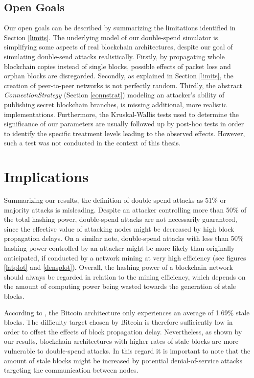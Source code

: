 \documentclass[a4paper,12pt,twoside]{report}
\begin{document}
\subsection{Open Goals}
Our open goals can be described by summarizing the limitations identified in Section \ref{limits}. The underlying model of our double-spend simulator is simplifying some aspects of real blockchain architectures, despite our goal of simulating double-send attacks realistically. Firstly, by propagating whole blockchain copies instead of single blocks, possible effects of packet loss and orphan blocks are disregarded. Secondly, as explained in Section \ref{limits}, the creation of peer-to-peer networks is not perfectly random. Thirdly, the abstract \textit{ConnectionStrategy} (Section \ref{connstrat}) modeling an attacker's ability of publishing secret blockchain branches, is missing additional, more realistic implementations. Furthermore, the Kruskal-Wallis tests used to determine the significance of our parameters are usually followed up by post-hoc tests in order to identify the specific treatment levels leading to the observed effects. However, such a test was not conducted in the context of this thesis.
\section{Implications}
Summarizing our results, the definition of double-spend attacks as 51\% or majority attacks is misleading. Despite an attacker controlling more than 50\% of the total hashing power, double-spend attacks are not necessarily guaranteed, since the effective value of attacking nodes might be decreased by high block propagation delays. On a similar note, double-spend attacks with less than 50\% hashing power controlled by an attacker might be more likely than originally anticipated, if conducted by a network mining at very high efficiency (see figures \ref{latplot} and \ref{densplot}). Overall, the hashing power of a blockchain network should always be regarded in relation to the mining efficiency, which depends on the amount of computing power being wasted towards the generation of stale blocks.

According to \cite{infoprop}, the Bitcoin architecture only experiences an average of 1.69\% stale blocks. The difficulty target chosen by Bitcoin is therefore sufficiently low in order to offset the effects of block propagation delay. Nevertheless, as shown by our results, blockchain architectures with higher rates of stale blocks are more vulnerable to double-spend attacks. In this regard it is important to note that the amount of stale blocks might be increased by potential denial-of-service attacks targeting the communication between nodes.
\end{document}

